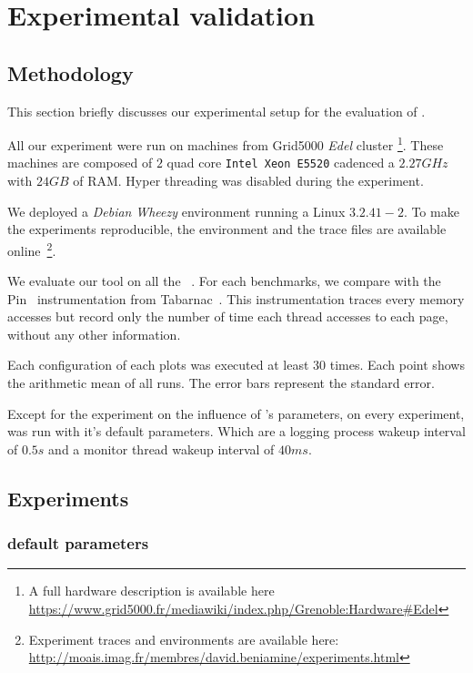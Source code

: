 \section{Experimental validation}
\label{sec:expe}

\subsection{Methodology}
\label{sec:exp-methodo}

This section briefly discusses our experimental setup for the evaluation of
\Moca.

All our experiment were run on  machines from Grid5000 \emph{Edel} cluster
\footnote{A full hardware description is available here\\
    \url{https://www.grid5000.fr/mediawiki/index.php/Grenoble:Hardware\#Edel}}.
    These machines are composed of $2$ quad core \texttt{Intel Xeon E5520}
    cadenced a $2.27GHz$ with
    $24 GB$ of RAM. Hyper threading was disabled during the experiment.

We deployed a \emph{Debian} \emph{Wheezy} environment running a Linux $3.2.41-2$.
To make the experiments reproducible, the environment and the trace files are
available
online~\footnote{Experiment traces and environments are available here:\\ \url{http://moais.imag.fr/membres/david.beniamine/experiments.html}}.

We evaluate our tool on all the \NPB~\cite{Jin1999}. For
each benchmarks, we compare \Moca with the Pin~\cite{Luk05Pin} instrumentation
from Tabarnac~\cite{Beniamine15TABARNACRR}. This instrumentation traces every
memory accesses but record only the number of time each thread accesses to
each page, without any other information.

Each configuration of each plots was executed at least $30$ times. Each point
shows the arithmetic mean of all runs. The error bars represent
the standard error.

Except for the experiment on the influence of \Moca's parameters, on every
experiment, \Moca was run with it's default parameters. Which are a logging
process wakeup interval of $0.5s$ and a monitor thread wakeup interval
of $40ms$.


\subsection{Experiments}
\label{sec:expe-ovh}

\subsubsection{\Moca default parameters}

